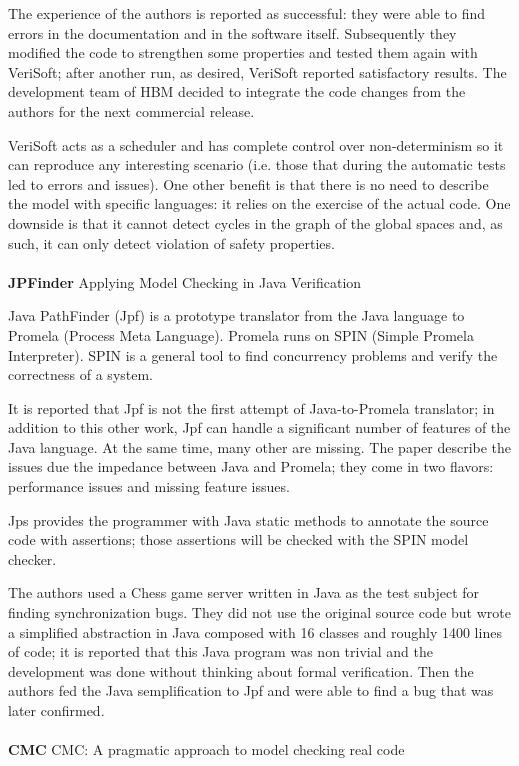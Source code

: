 The experience of the authors is reported as successful: they were able to find errors in the documentation and in the software itself. Subsequently they modified the code to strengthen some properties and tested them again with VeriSoft; after another run, as desired, VeriSoft reported satisfactory results.
The development team of HBM decided to integrate the code changes from the authors for the next commercial release.

VeriSoft acts as a scheduler and has complete control over non-determinism so it can reproduce any interesting scenario (i.e. those that during the automatic tests led to errors and issues).
One other benefit is that there is no need to describe the model with specific languages: it relies on the exercise of the actual code.
One downside is that it cannot detect cycles in the graph of the global spaces and, as such, it can only detect violation of safety properties.
\\
\\
\textbf{JPFinder} \cite{havelund1999applying} Applying Model Checking in Java Verification

Java PathFinder (Jpf) is a prototype translator from the Java language to Promela (Process Meta Language). Promela runs on SPIN (Simple Promela Interpreter).
SPIN is a general tool to find concurrency problems and verify the correctness of a system.

It is reported that Jpf is not the first attempt of Java-to-Promela translator; in addition to this other work, Jpf can handle a significant number of features of the Java language. At the same time, many other are missing.
The paper describe the issues due the impedance between Java and Promela; they come in two flavors: performance issues and missing feature issues.

Jps provides the programmer with Java static methods to annotate the source code with assertions; those assertions will be checked with the SPIN model checker.

The authors used a Chess game server written in Java as the test subject for finding synchronization bugs. They did not use the original source code but wrote a simplified abstraction in Java composed with 16 classes and roughly 1400 lines of code; it is reported that this Java program was non trivial and the development was done without thinking about formal verification.
Then the authors fed the Java semplification to Jpf and were able to find a bug that was later confirmed. 
\\
\\
\textbf{CMC} \cite{musuvathi2002cmc} CMC: A pragmatic approach to model checking real code


